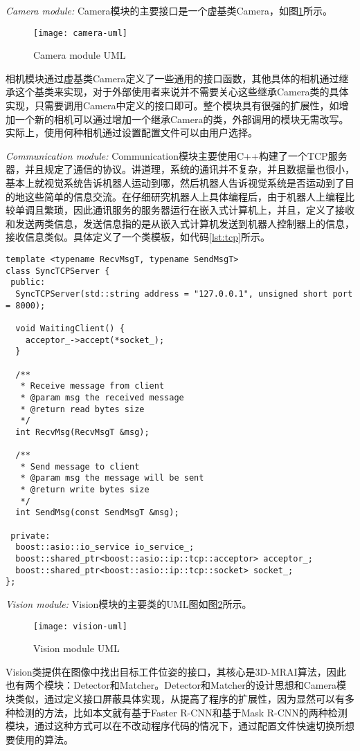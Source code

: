 \emph{Camera module:}
Camera模块的主要接口是一个虚基类Camera，如图\ref{fig:camera-uml}所示。
\begin{figure}[ht]
  \centering
  \texttt{[image: camera-uml]}
  \caption{Camera module UML}
  \label{fig:camera-uml}
\end{figure}
相机模块通过虚基类Camera定义了一些通用的接口函数，其他具体的相机通过继承这个基类来实现，对于外部使用者来说并不需要关心这些继承Camera类的具体实现，只需要调用Camera中定义的接口即可。整个模块具有很强的扩展性，如增加一个新的相机可以通过增加一个继承Camera的类，外部调用的模块无需改写。实际上，使用何种相机通过设置配置文件可以由用户选择。

\emph{Communication module:}
Communication模块主要使用C++构建了一个TCP服务器，并且规定了通信的协议。讲道理，系统的通讯并不复杂，并且数据量也很小，基本上就视觉系统告诉机器人运动到哪，然后机器人告诉视觉系统是否运动到了目的地这些简单的信息交流。在仔细研究机器人上具体编程后，由于机器人上编程比较单调且繁琐，因此通讯服务的服务器运行在嵌入式计算机上，并且，定义了接收和发送两类信息，发送信息指的是从嵌入式计算机发送到机器人控制器上的信息，接收信息类似。具体定义了一个类模板，如代码\ref{lst:tcp}所示。
\begin{lstlisting}[caption=TCP server template, label=lst:tcp]
template <typename RecvMsgT, typename SendMsgT>
class SyncTCPServer {
 public:
  SyncTCPServer(std::string address = "127.0.0.1", unsigned short port = 8000);

  void WaitingClient() {
    acceptor_->accept(*socket_);
  }

  /**
   * Receive message from client
   * @param msg the received message
   * @return read bytes size
   */
  int RecvMsg(RecvMsgT &msg);

  /**
   * Send message to client
   * @param msg the message will be sent
   * @return write bytes size
   */
  int SendMsg(const SendMsgT &msg);

 private:
  boost::asio::io_service io_service_;
  boost::shared_ptr<boost::asio::ip::tcp::acceptor> acceptor_;
  boost::shared_ptr<boost::asio::ip::tcp::socket> socket_;
};
\end{lstlisting}

\emph{Vision module:}
Vision模块的主要类的UML图如图\ref{fig:vision-uml}所示。
\begin{figure}[ht]
  \centering
  \texttt{[image: vision-uml]}
  \caption{Vision module UML}
  \label{fig:vision-uml}
\end{figure}
Vision类提供在图像中找出目标工件位姿的接口，其核心是3D-MRAI算法，因此也有两个模块：Detector和Matcher。Detector和Matcher的设计思想和Camera模块类似，通过定义接口屏蔽具体实现，从提高了程序的扩展性，因为显然可以有多种检测的方法，比如本文就有基于Faster R-CNN和基于Mask R-CNN的两种检测模块，通过这种方式可以在不改动程序代码的情况下，通过配置文件快速切换所想要使用的算法。

